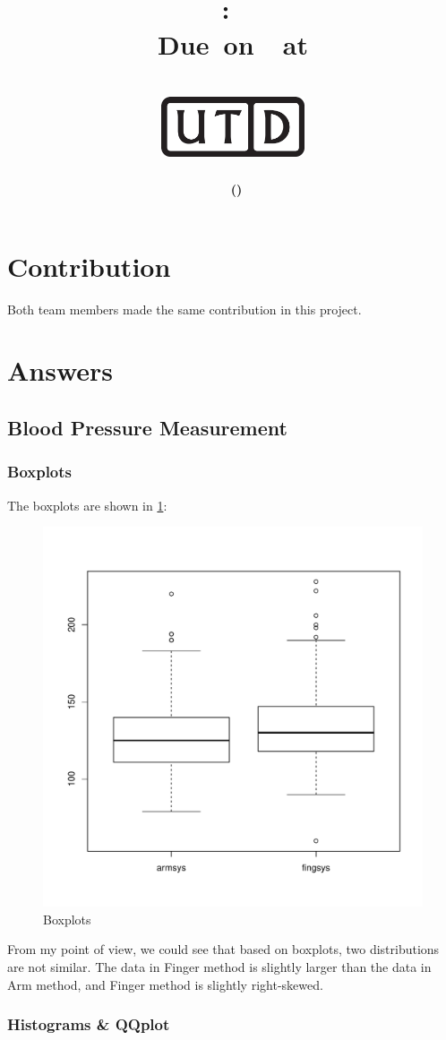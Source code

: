 \documentclass[12pt,letterpaper,titlepage,en-US]{article}
\title{
    \vspace{1in}
    \textmd{\textbf{\hmwkClassName \\\hmwkClass:\ \hmwkTitle }}\\
    \normalsize\vspace{0.1in}\small{Due\ on\ \DTMusedate{DueDate}\ at \DTMusetime{DueDate} }\\
    \vspace{0.1in}\large{\textit{\hmwkClassInstructor}}\\
    \vspace{0.5in}\includegraphics[height=2.4em]{UTD_logo_BW}\\
    \vspace{2in}
}
\author{\textbf{\hmwkAuthorName\ \footnotesize{(\hmwkAuthorNetID)}} \\ }
\date{}
\begin{document}
\maketitle



{}


\section*{Contribution}
Both team members made the same contribution in this project.

\section{Answers}
\subsection{Blood Pressure Measurement}
\subsubsection{Boxplots}
The boxplots are shown in \cref{pic1}:
\begin{figure}[H]
\caption{Boxplots}
\label{pic1}
\centering
\includegraphics[width=.6\textwidth]{figure/pic1.pdf}
\end{figure}
From my point of view, we could see that based on boxplots, two distributions are not similar. The data in Finger method is slightly larger than the data in Arm method, and Finger method is slightly right-skewed.

\pagebreak
\subsubsection{Histograms \& QQplot}
\end{document}
